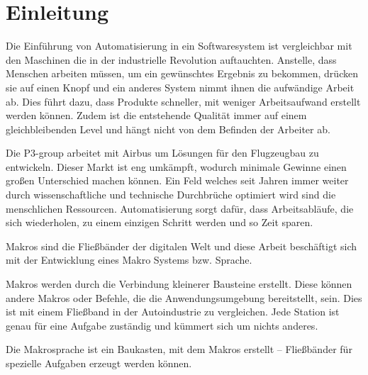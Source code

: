 




\tableofcontents
\newpage

\section{Einleitung}
\label{sec:einleitung}
  Die Einführung von Automatisierung in ein Softwaresystem ist vergleichbar mit den Maschinen die in der industrielle Revolution auftauchten. Anstelle, dass Menschen arbeiten müssen, um ein gewünschtes Ergebnis zu bekommen, drücken sie auf einen Knopf und ein anderes System nimmt ihnen die aufwändige Arbeit ab. Dies führt dazu, dass Produkte schneller, mit weniger Arbeitsaufwand erstellt werden können. Zudem ist die entstehende Qualität immer auf einem gleichbleibenden Level und hängt nicht von dem Befinden der Arbeiter ab.

  Die P3-group arbeitet mit Airbus um Lösungen für den Flugzeugbau zu entwickeln. Dieser Markt ist eng umkämpft, wodurch minimale Gewinne einen großen Unterschied machen können. Ein Feld welches seit Jahren immer weiter durch wissenschaftliche und technische Durchbrüche optimiert wird sind die menschlichen Ressourcen. Automatisierung sorgt dafür, dass Arbeitsabläufe, die sich wiederholen, zu einem einzigen Schritt werden und so Zeit sparen.

  Makros sind die Fließbänder der digitalen Welt und diese Arbeit beschäftigt sich mit der Entwicklung eines Makro Systems bzw. Sprache.

  Makros werden durch die Verbindung kleinerer Bausteine erstellt. Diese können andere Makros oder Befehle, die die Anwendungsumgebung bereitstellt, sein. Dies ist mit einem Fließband in der Autoindustrie zu vergleichen. Jede Station ist genau für eine Aufgabe zuständig und kümmert sich um nichts anderes.

  Die Makrosprache ist ein Baukasten, mit dem Makros erstellt -- Fließbänder für spezielle Aufgaben erzeugt werden können.


